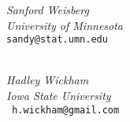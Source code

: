 \documentclass{report}
\begin{document}
\begin{article}
\begin{flushleft}
{\em Sanford Weisberg\\
University of Minnesota\\} {\tt sandy@stat.umn.edu}

\ \\
{\em Hadley Wickham\\Iowa State University\\}{\tt
h.wickham@gmail.com}
\end{flushleft}

\end{article}
\end{document}
